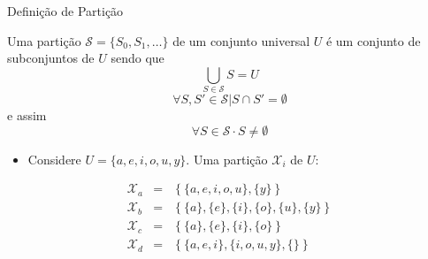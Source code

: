    
   \begin{frame}{Definição de Partição}
   
      Uma partição $ \mathcal{S} = \{S_0, S_1, \dots\} $ de um conjunto universal $ U $ é um conjunto de subconjuntos de $ U $ sendo que
         \begin{equation}
            \bigcup_{S \in \mathcal{S}} S = U \label{eq:part_form_1}
         \end{equation}
         \begin{equation}
            \forall S, S' \in \mathcal{S} | S \cap S' = \emptyset \label{eq:part_form_2}
         \end{equation}
         e assim
         \begin{equation}
            \forall S \in \mathcal{S} \cdot S \neq \emptyset \label{eq:part_form_3}
         \end{equation}

            \bigskip    
            
         \begin{itemize}
            \item Considere $ U = \{a, e, i, o, u, y\} $. Uma partição $ \mathcal{X}_i $ de $ U $:
         
         \end{itemize}
         \begin{eqnarray}
         \mathcal{X}_a &=& \left\{\{a, e, i, o, u\}, \{y\}\right\} \label{eq:xa} \\
         \mathcal{X}_b &=& \left\{\{a\}, \{e\}, \{i\}, \{o\}, \{u\}, \{y\}\right\} \label{eq:part_a} \\
         \mathcal{X}_c &=& \left\{\{a\}, \{e\}, \{i\}, \{o\} \right\} \label{eq:part_c} \\
         \mathcal{X}_d &=& \left\{\{a, e, i\}, \{i, o, u, y\}, \{\}\right\} \label{eq:part_d}
         \end{eqnarray}  
   \end{frame}
   
